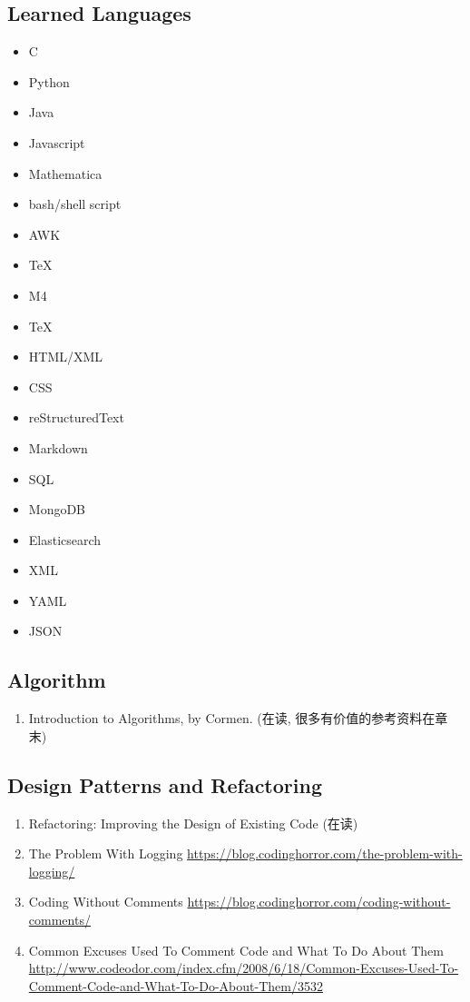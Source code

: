 \documentclass{article}
\begin{document}
\subsection{Learned Languages}
\begin{itemize}
    \item C
    \item Python
    \item Java
    \item Javascript
    \item Mathematica
    \item bash/shell script
    \item AWK
    \item TeX
    \item M4
    \item TeX
    \item HTML/XML
    \item CSS
    \item reStructuredText
    \item Markdown
    \item SQL
    \item MongoDB
    \item Elasticsearch
    \item XML
    \item YAML
    \item JSON
\end{itemize}
%
\subsection{Algorithm}
\begin{enumerate}
    \item Introduction to Algorithms, by Cormen. (在读, 很多有价值的参考资料在章末)
\end{enumerate}
\subsection{Design Patterns and Refactoring}
\begin{enumerate}
    \item Refactoring: Improving the Design of Existing Code (在读)
    \item The Problem With Logging
        \url{https://blog.codinghorror.com/the-problem-with-logging/}
    \item Coding Without Comments
        \url{https://blog.codinghorror.com/coding-without-comments/}
    \item Common Excuses Used To Comment Code and What To Do About Them
        \url{http://www.codeodor.com/index.cfm/2008/6/18/Common-Excuses-Used-To-Comment-Code-and-What-To-Do-About-Them/3532}
\end{enumerate}
\end{document}
